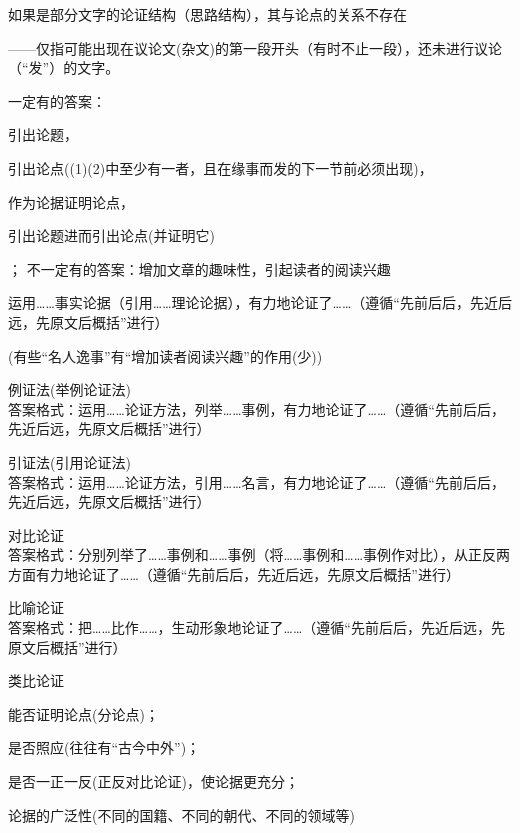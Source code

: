 {如果是部分文字的论证结构（思路结构），其与论点的关系不存在

——仅指可能出现在议论文(杂文)的第一段开头（有时不止一段），还未进行议论（``发''）的文字。\par
一定有的答案：\begin{inparaenum}[(1)]\item 引出论题，\item 引出论点((1)(2)中至少有一者，且在缘事而发的下一节前必须出现)，\item 作为论据证明论点，\item 引出论题进而引出论点(并证明它)\end{inparaenum}；
不一定有的答案：增加文章的趣味性，引起读者的阅读兴趣

运用\ldots{}\ldots{}事实论据（引用\ldots{}\ldots{}理论论据），有力地论证了\ldots{}\ldots{}（遵循``先前后后，先近后远，先原文后概括''进行）

(有些``名人逸事''有``增加读者阅读兴趣''的作用(少))

\begin{asparaenum}[(1)]
\item 例证法(举例论证法)\\
答案格式：运用\ldots{}\ldots{}论证方法，列举\ldots{}\ldots{}事例，有力地论证了\ldots{}\ldots{}（遵循``先前后后，先近后远，先原文后概括''进行）
\item 引证法(引用论证法)\\
答案格式：运用\ldots{}\ldots{}论证方法，引用\ldots{}\ldots{}名言，有力地论证了\ldots{}\ldots{}（遵循``先前后后，先近后远，先原文后概括''进行）
\item 对比论证\\
答案格式：分别列举了\ldots{}\ldots{}事例和\ldots{}\ldots{}事例（将\ldots{}\ldots{}事例和\ldots{}\ldots{}事例作对比），从正反两方面有力地论证了\ldots{}\ldots{}（遵循``先前后后，先近后远，先原文后概括''进行）
\item 比喻论证\\
答案格式：把\ldots{}\ldots{}比作\ldots{}\ldots{}，生动形象地论证了\ldots{}\ldots{}（遵循``先前后后，先近后远，先原文后概括''进行）
\item 类比论证
\end{asparaenum}

\begin{asparaenum}[(1)]
\item 能否证明论点(分论点)；
\item 是否照应(往往有``古今中外'')；
\item 是否一正一反(正反对比论证)，使论据更充分；
\item 论据的广泛性(不同的国籍、不同的朝代、不同的领域等)
\end{asparaenum}

}
